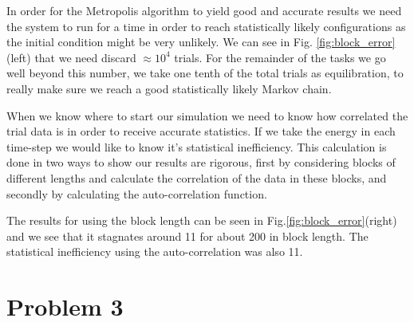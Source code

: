 In order for the Metropolis algorithm to yield good and accurate results we need the system to run for a time in order to reach statistically likely configurations as the initial condition might be very unlikely. We can see in Fig. \ref{fig:block_error}(left) that we need discard $\approx10^4$ trials. For the remainder of the tasks we go well beyond this number, we take one tenth of the total trials as equilibration, to really make sure we reach a good statistically likely Markov chain.

When we know where to start our simulation we need to know how correlated the trial data is in order to receive accurate statistics. If we take the energy in each time-step we would like to know it's statistical inefficiency. This calculation is done in two ways to show our results are rigorous, first by considering blocks of different lengths and calculate the correlation of the data in these blocks, and secondly by calculating the auto-correlation function.

The results for using the block length can be seen in Fig.\ref{fig:block_error}(right) and we see that it stagnates around 11 for about 200 in block length. The statistical inefficiency using the auto-correlation was also 11.




\section*{Problem 3}



